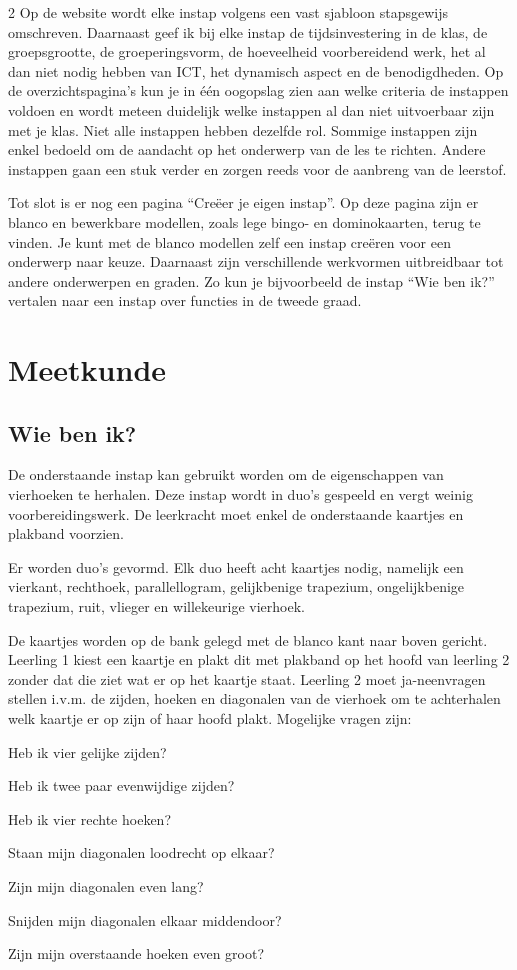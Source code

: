 \begin{multicols}{2}
Op de website wordt elke instap volgens een vast sjabloon stapsgewijs omschreven. Daarnaast geef ik bij elke instap de tijdsinvestering in de klas, de groepsgrootte, de groeperingsvorm, de hoeveelheid voorbereidend werk, het al dan niet nodig hebben van ICT, het dynamisch aspect en de benodigdheden. Op de overzichtspagina’s kun je in één oogopslag zien aan welke criteria de instappen voldoen en wordt meteen duidelijk welke instappen al dan niet uitvoerbaar zijn met je klas. Niet alle instappen hebben dezelfde rol. Sommige instappen zijn enkel bedoeld om de aandacht op het onderwerp van de les te richten. Andere instappen gaan een stuk verder en zorgen reeds voor de aanbreng van de leerstof.

Tot slot is er nog een pagina “Creëer je eigen instap”. Op deze pagina zijn er blanco en bewerkbare modellen, zoals lege bingo- en dominokaarten, terug te vinden. Je kunt met de blanco modellen zelf een instap creëren voor een onderwerp naar keuze. Daarnaast zijn verschillende werkvormen uitbreidbaar tot andere onderwerpen en graden. Zo kun je bijvoorbeeld de instap “Wie ben ik?” vertalen naar een instap over functies in de tweede graad.

\section{Meetkunde}

\subsection{Wie ben ik?}
De onderstaande instap kan gebruikt worden om de eigenschappen van vierhoeken te herhalen. Deze instap wordt in duo’s gespeeld en vergt weinig voorbereidingswerk. De leerkracht moet enkel de onderstaande kaartjes en plakband voorzien. 

Er worden duo’s gevormd. Elk duo heeft acht kaartjes nodig, namelijk een vierkant, rechthoek, parallellogram, gelijkbenige trapezium, ongelijkbenige trapezium, ruit, vlieger en willekeurige vierhoek.

De kaartjes worden op de bank gelegd met de blanco kant naar boven gericht. Leerling 1 kiest een kaartje en plakt dit met plakband op het hoofd van leerling 2 zonder dat die ziet wat er op het kaartje staat.
Leerling 2 moet ja-neenvragen stellen i.v.m. de zijden, hoeken en diagonalen van de vierhoek om te achterhalen welk kaartje er op zijn of haar hoofd plakt. Mogelijke vragen zijn: 
\begin{opsomming} 
\item Heb ik vier gelijke zijden?
\item Heb ik twee paar evenwijdige zijden?
\item Heb ik vier rechte hoeken?
\item Staan mijn diagonalen loodrecht op elkaar?
\item Zijn mijn diagonalen even lang?
\item Snijden mijn diagonalen elkaar middendoor?
\item Zijn mijn overstaande hoeken even groot?
\end{opsomming}


\end{multicols}
